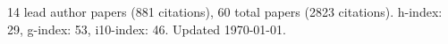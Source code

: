 14 lead author papers (881 citations),
60 total papers (2823 citations).\newline
h-index: 29, g-index: 53, i10-index: 46. Updated \today.